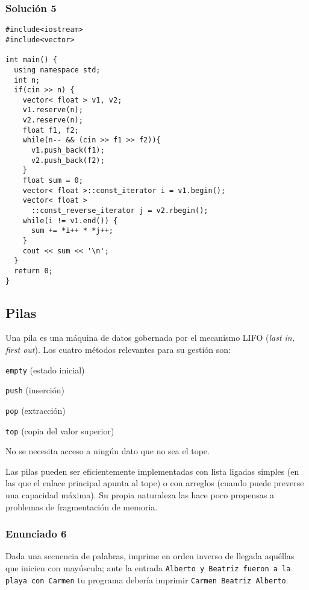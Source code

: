 \documentclass[10pt,letterpaper,twocolumn,spanish]{article}
\begin{document}
\subsubsection*{Solución 5}

\begin{verbatim}
#include<iostream>
#include<vector>

int main() {
  using namespace std;
  int n;
  if(cin >> n) {
    vector< float > v1, v2;
    v1.reserve(n);
    v2.reserve(n);
    float f1, f2;
    while(n-- && (cin >> f1 >> f2)){
      v1.push_back(f1);
      v2.push_back(f2);
    }
    float sum = 0;
    vector< float >::const_iterator i = v1.begin();
    vector< float >
      ::const_reverse_iterator j = v2.rbegin();
    while(i != v1.end()) {
      sum += *i++ * *j++;
    }
    cout << sum << '\n';
  }
  return 0;
}
\end{verbatim}

\subsection*{Pilas}

Una pila es una máquina de datos gobernada por el mecanismo LIFO (\textit{last in, first out}). Los cuatro métodos relevantes para su gestión son:

\begin{compactitem}
\item \texttt{empty} (estado inicial)
\item \texttt{push} (inserción)
\item \texttt{pop} (extracción)
\item \texttt{top} (copia del valor superior)
\end{compactitem}

No se necesita acceso a ningún dato que no sea el tope.

Las pilas pueden ser eficientemente implementadas con lista ligadas simples (en las que el enlace principal apunta al tope) o con arreglos (cuando puede preverse una capacidad máxima). Su propia naturaleza las hace poco propensas a problemas de fragmentación de memoria.

\subsubsection*{Enunciado 6}

Dada una secuencia de palabras, imprime en orden inverso de llegada aquéllas que inicien con mayúscula; ante la entrada \texttt{Alberto y Beatriz fueron a la playa con Carmen} tu programa debería imprimir \texttt{Carmen Beatriz Alberto}.
\end{document}
